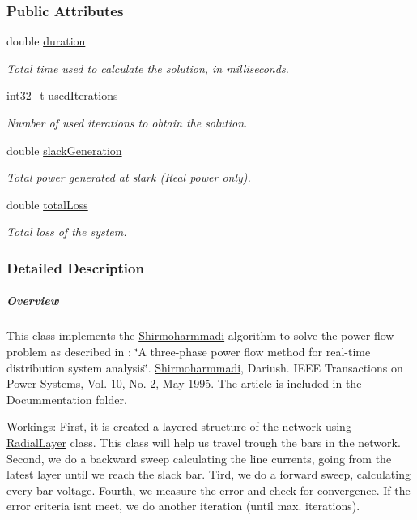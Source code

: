 \subsubsection*{Public Attributes}
\begin{DoxyCompactItemize}
\item 
double \hyperlink{class_shirmoharmmadi_a32ab19ff485833106bf68cd91dbc94e6}{duration}
\begin{DoxyCompactList}\small\item\em Total time used to calculate the solution, in milliseconds. \end{DoxyCompactList}\item 
int32\+\_\+t \hyperlink{class_shirmoharmmadi_afdd22da0145b033c47f4f8a6bbd37d0d}{used\+Iterations}
\begin{DoxyCompactList}\small\item\em Number of used iterations to obtain the solution. \end{DoxyCompactList}\item 
double \hyperlink{class_shirmoharmmadi_aeb47da6439c2e92c7ebcc59ebb71624b}{slack\+Generation}
\begin{DoxyCompactList}\small\item\em Total power generated at slark (Real power only). \end{DoxyCompactList}\item 
double \hyperlink{class_shirmoharmmadi_a0c02ead0472b54a84fc746a13b8d02b2}{total\+Loss}
\begin{DoxyCompactList}\small\item\em Total loss of the system. \end{DoxyCompactList}\end{DoxyCompactItemize}


\subsubsection{Detailed Description}
\subparagraph*{Overview}

This class implements the \hyperlink{class_shirmoharmmadi}{Shirmoharmmadi} algorithm to solve the power flow problem as described in \+: \char`\"{}\+A three-\/phase power flow method   for real-\/time
distribution system analysis\char`\"{}. \hyperlink{class_shirmoharmmadi}{Shirmoharmmadi}, Dariush. I\+E\+E\+E Transactions on Power Systems, Vol. 10, No. 2, May 1995. The article is included in the Docummentation folder.

Workings\+: First, it is created a layered structure of the network using \hyperlink{class_radial_layer}{Radial\+Layer} class. This class will help us travel trough the bars in the network. Second, we do a backward sweep calculating the line currents, going from the latest layer until we reach the slack bar. Tird, we do a forward sweep, calculating every bar voltage. Fourth, we measure the error and check for convergence. If the error criteria isn\textquotesingle{}t meet, we do another iteration (until max. iterations).

